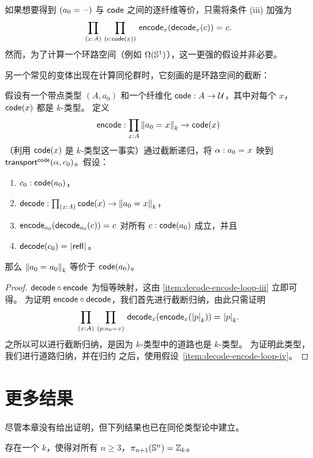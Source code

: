 如果想要得到 $(\id{a_0}{\blank})$ 与 $\code$ 之间的逐纤维等价，只需将条件 (iii) 加强为
\[
\prd{x:A}{c : \code(x)} \id{\encode_{x}(\decode_{x}(c))}{c}.
\]
然而，为了计算一个环路空间（例如 $\Omega(\Sn ^1)$），这一更强的假设并非必要。

另一个常见的变体出现在计算同伦群时，它刻画的是环路空间的截断：

\begin{lem}[环路空间截断的编码-解码]
假设有一个带点类型 $(A,a_0)$ 和一个纤维化 $\code : A \to \type$，其中对每个 $x$，$\code(x)$ 都是 $k$-类型。
定义
\[
\encode : \prd{x:A} \trunc{k}{\id{a_0}{x}} \to \code(x)
\]
（利用 $\code(x)$ 是 $k$-类型这一事实）通过截断递归，将 $\alpha : \id{a_0}{x}$ 映到 $\transfib{\code}{\alpha}{c_0}$。假设：
\begin{enumerate}
\item $c_0 : \code(a_0)$，
\item $\decode : \prd{x:A} \code(x) \to \trunc{k}{\id{a_0}{x}}$，
\item \label{item:decode-encode-loop-iii}
  $\id{\encode_{a_0}(\decode_{a_0}(c))}{c}$ 对所有 $c : \code(a_0)$ 成立，并且
\item \label{item:decode-encode-loop-iv}
  $\id{\decode(c_0)}{\tproj{}{\refl{}}}$。
\end{enumerate}
那么 $\trunc{k}{\id{a_0}{a_0}}$ 等价于 $\code(a_0)$。
\end{lem}

\begin{proof}
$\decode \circ \encode$ 为恒等映射，这由 \ref{item:decode-encode-loop-iii} 立即可得。
%
为证明 $\encode \circ \decode$，我们首先进行截断归纳，由此只需证明
\[
\prd{x:A}{p : \id{a_0}{x}} \id{\decode_{x}(\encode_{x}(\tproj{k}{p}))}{\tproj{k}{p}}.
\]
之所以可以进行截断归纳，是因为 $k$-类型中的道路也是 $k$-类型。
为证明此类型，我们进行道路归纳，并在归约 \encode 之后，使用假设~\ref{item:decode-encode-loop-iv}。
\end{proof}

\section{更多结果}
\label{sec:moreresults}

尽管本章没有给出证明，但下列结果也已在同伦类型论中建立。

\begin{thm}
存在一个 $k$，使得对所有 $n \ge 3$，$\pi_{n+1}(\Sn ^n) =
\Z_k$。
\end{thm}

